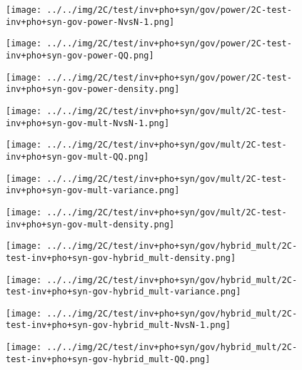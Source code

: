 \begin{figure}[H]
\centering	\texttt{[image: ../../img/2C/test/inv+pho+syn/gov/power/2C-test-inv+pho+syn-gov-power-NvsN-1.png]}
\end{figure}
\begin{figure}[H]
\centering	\texttt{[image: ../../img/2C/test/inv+pho+syn/gov/power/2C-test-inv+pho+syn-gov-power-QQ.png]}
\end{figure}
\begin{figure}[H]
\centering	\texttt{[image: ../../img/2C/test/inv+pho+syn/gov/power/2C-test-inv+pho+syn-gov-power-density.png]}
\end{figure}
\begin{figure}[H]
\centering	\texttt{[image: ../../img/2C/test/inv+pho+syn/gov/mult/2C-test-inv+pho+syn-gov-mult-NvsN-1.png]}
\end{figure}
\begin{figure}[H]
\centering	\texttt{[image: ../../img/2C/test/inv+pho+syn/gov/mult/2C-test-inv+pho+syn-gov-mult-QQ.png]}
\end{figure}
\begin{figure}[H]
\centering	\texttt{[image: ../../img/2C/test/inv+pho+syn/gov/mult/2C-test-inv+pho+syn-gov-mult-variance.png]}
\end{figure}
\begin{figure}[H]
\centering	\texttt{[image: ../../img/2C/test/inv+pho+syn/gov/mult/2C-test-inv+pho+syn-gov-mult-density.png]}
\end{figure}
\begin{figure}[H]
\centering	\texttt{[image: ../../img/2C/test/inv+pho+syn/gov/hybrid\_mult/2C-test-inv+pho+syn-gov-hybrid\_mult-density.png]}
\end{figure}
\begin{figure}[H]
\centering	\texttt{[image: ../../img/2C/test/inv+pho+syn/gov/hybrid\_mult/2C-test-inv+pho+syn-gov-hybrid\_mult-variance.png]}
\end{figure}
\begin{figure}[H]
\centering	\texttt{[image: ../../img/2C/test/inv+pho+syn/gov/hybrid\_mult/2C-test-inv+pho+syn-gov-hybrid\_mult-NvsN-1.png]}
\end{figure}
\begin{figure}[H]
\centering	\texttt{[image: ../../img/2C/test/inv+pho+syn/gov/hybrid\_mult/2C-test-inv+pho+syn-gov-hybrid\_mult-QQ.png]}
\end{figure}
